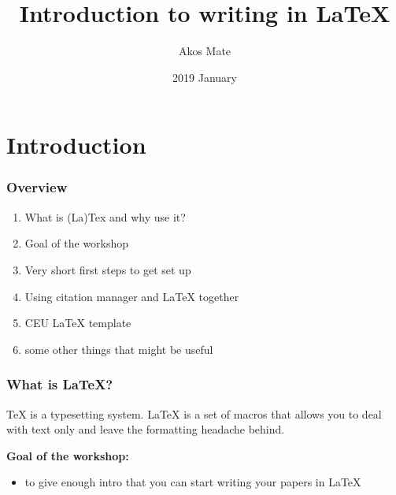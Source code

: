 \documentclass{beamer}
\title{Introduction to writing in LaTeX}
\author{Akos Mate}
\institute{Central European University}
\date{2019 January}
\begin{document}
\frame{\titlepage}

\section{Introduction}


\begin{frame}
	\frametitle{Overview}
	\begin{enumerate}
		\item What is (La)Tex and why use it?
		\item Goal of the workshop
		\item Very short first steps to get set up
		\item Using citation manager and LaTeX together
		\item CEU LaTeX template
		\item some other things that might be useful
	\end{enumerate}
\end{frame}



\begin{frame}
\frametitle{What is LaTeX?}
	TeX is a typesetting system. LaTeX is a set of macros that allows you to deal with text only and leave the formatting headache behind. \pause
	\bigskip

	\textbf{Goal of the workshop:} \pause
	\begin{itemize}
	    \item to give enough intro that you can start writing your papers in LaTeX
	\end{itemize}
	
\end{frame}

\end{document}
